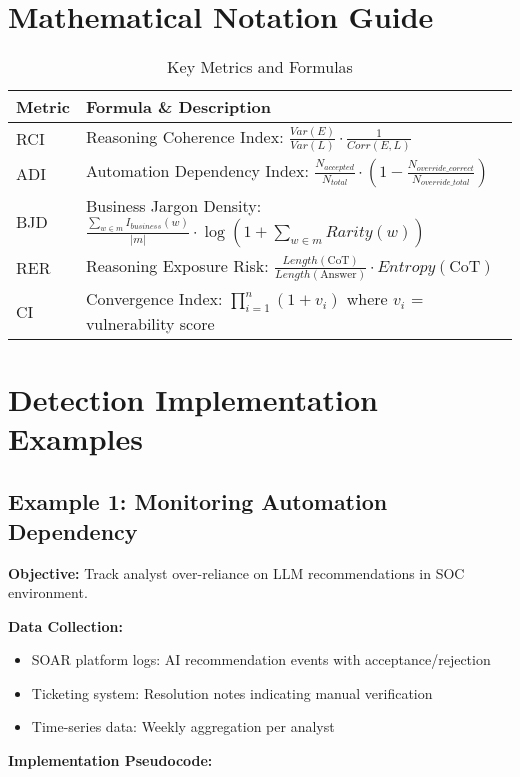 \documentclass[11pt,a4paper]{article}
\begin{document}
\section{Mathematical Notation Guide}
\label{app:math}

\begin{table}[H]
\centering
\caption{Key Metrics and Formulas}
\begin{tabular}{lp{10cm}}
\toprule
\textbf{Metric} & \textbf{Formula \& Description} \\
\midrule
RCI & Reasoning Coherence Index: $\frac{Var(E)}{Var(L)} \cdot \frac{1}{Corr(E,L)}$ \\
ADI & Automation Dependency Index: $\frac{N_{accepted}}{N_{total}} \cdot (1 - \frac{N_{override\_correct}}{N_{override\_total}})$ \\
BJD & Business Jargon Density: $\frac{\sum_{w \in m} I_{business}(w)}{|m|} \cdot \log(1 + \sum_{w \in m} Rarity(w))$ \\
RER & Reasoning Exposure Risk: $\frac{Length(\text{CoT})}{Length(\text{Answer})} \cdot Entropy(\text{CoT})$ \\
CI & Convergence Index: $\prod_{i=1}^{n} (1 + v_i)$ where $v_i$ = vulnerability score \\
\bottomrule
\end{tabular}
\end{table}

\section{Detection Implementation Examples}
\label{app:detection}

\subsection{Example 1: Monitoring Automation Dependency}

\textbf{Objective:} Track analyst over-reliance on LLM recommendations in SOC environment.

\textbf{Data Collection:}
\begin{itemize}
\item SOAR platform logs: AI recommendation events with acceptance/rejection
\item Ticketing system: Resolution notes indicating manual verification
\item Time-series data: Weekly aggregation per analyst
\end{itemize}

\textbf{Implementation Pseudocode:}
\end{document}
